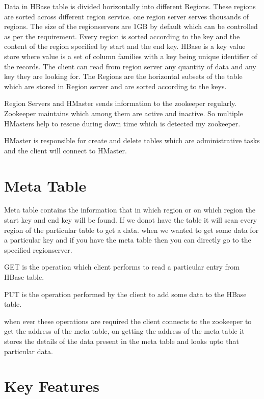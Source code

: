  Data in HBase table is divided horizontally into different Regions. These 
regions are sorted across different region service. one region server serves 
thousands of regions. The size of the regionservers are 1GB by default which 
can be controlled as per the requirement. Every region is sorted according to 
the key and the content of the region specified by start and the end key. HBase
is a key value store where value is a set of column families with a key being 
unique identifier of the records. The client can read from region server any 
quantity of data and any key they are looking for. The Regions are the horizontal
subsets of the table which are stored in Region server and are sorted according 
to the keys. 

 Region Servers and HMaster sends information to the zookeeper regularly. 
Zookeeper maintains which among them are active and inactive. So multiple 
HMasters help to rescue during down time which is detected my zookeeper. 

 HMaster is responsible for create and delete tables which are administrative 
 tasks and the client will connect to HMaster.

 \section{Meta Table} Meta table contains the information that in which region or
 on which region the start key and end key will be found. If we donot have the 
 table it will scan every region of the particular table to get a data. when we 
 wanted to get some data for a particular key and if you have the meta table then 
 you can directly go to the specified regionserver.
 \begin{description}
 \item GET is the operation which client performs to read a particular entry from
  HBase table.
\item PUT is the operation performed by the client to add some data to the HBase
 table.
\end{description}
 when ever these operations are required the client connects to the zookeeper to
 get the address of the meta table, on getting the address of the meta table it 
 stores the details of the data present in the meta table and looks upto that 
 particular data. 

\section{Key Features}

